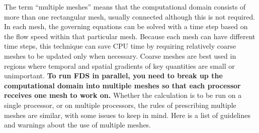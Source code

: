 \documentclass[11pt]{book}
\begin{document}
The term ``multiple meshes'' means that the computational domain consists of
more than one rectangular mesh, usually connected although this is not
required. In each mesh, the governing equations can be solved with a time
step based on the flow speed within that particular mesh. Because each
mesh can have different time steps, this technique can save CPU time by
requiring relatively coarse meshes to be updated only when necessary.
Coarse meshes are best used in regions where temporal and spatial gradients of key
quantities are small or unimportant.
{\bf To run FDS in parallel, you need to break up the computational domain into
multiple meshes so that each processor receives one mesh to work on.} Whether
the calculation is to be run on a single processor, or on multiple processors,
the rules of prescribing multiple meshes are similar, with some issues to keep in mind.
Here is a list of guidelines and warnings about the use of multiple meshes.
\end{document}
